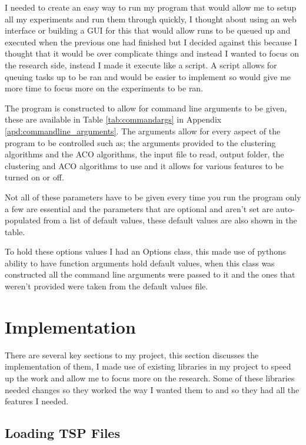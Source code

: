 I needed to create an easy way to run my program that would allow me to setup all my experiments and run them through quickly, I thought about using an web interface or building a GUI for this that would allow runs to be queued up and executed when the previous one had finished but I decided against this because I thought that it would be over complicate things and instead I wanted to focus on the research side, instead I made it execute like a script. A script allows for queuing tasks up to be ran and would be easier to implement so would give me more time to focus more on the experiments to be ran.

The program is constructed to allow for command line arguments to be given, these are available in Table \ref{tab:commandargs} in Appendix \ref{apd:commandline_arguments}. The arguments allow for every aspect of the program to be controlled such as; the arguments provided to the clustering algorithms and the ACO algorithms, the input file to read, output folder, the clustering and ACO algorithms to use and it allows for various features to be turned on or off. 

Not all of these parameters have to be given every time you run the program only a few are essential and the parameters that are optional and aren't set are auto-populated from a list of default values, these default values are also shown in the table.

To hold these options values I had an Options class, this made use of pythons ability to have function arguments hold default values, when this class was constructed all the command line arguments were passed to it and the ones that weren't provided were taken from the default values file.

\section{Implementation}

There are several key sections to my project, this section discusses the implementation of them, I made use of existing libraries in my project to speed up the work and allow me to focus more on the research. Some of these libraries needed changes so they worked the way I wanted them to and so they had all the features I needed. 

\subsection{Loading TSP Files}

